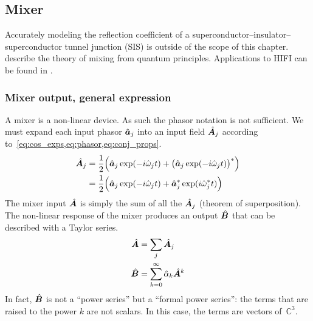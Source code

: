 \clearpage
\subsection{Mixer}
Accurately modeling the reflection coefficient of a superconductor--insulator--superconductor tunnel junction (SIS) is outside of the scope of this chapter.
\Textcite{tucker1985quantum} describe the theory of mixing from quantum principles.
Applications to HIFI can be found in \textcite{kooi2008}.

\subsubsection{Mixer output, general expression}

A mixer is a non-linear device.
As such the phasor notation is not sufficient.
We must expand
each    input phasor $\hat{\bm{a}}_j$
into an input field  $\hat{\bm{A}}_j$
according to~\cref{eq:cos_exps,eq:phasor,eq:conj_props}.
\begin{align}
    \hat{\bm{A}}_j
    &=
    \frac{1}{2}
    \Big(
              \hat{\bm{a}}_j \exp(-i \hat{\omega}_j t)
        +
        \big( \hat{\bm{a}}_j \exp(-i \hat{\omega}_j t) \big)^*
    \Big) \notag
    \\
    &=
    \frac{1}{2}
    \Big(
              \hat{\bm{a}}_j \exp(-i \hat{\omega}_j t)
        +
              \hat{\bm{a}}_j^* \exp(i \hat{\omega}_j^* t)
    \Big)
\end{align}
The mixer input $\hat{\bm{A}}$ is simply the sum of all the $\hat{\bm{A}}_j$ (theorem of superposition).
The non-linear response of the mixer produces an output $\hat{\bm{B}}$ that can be described with a Taylor series.
\begin{align}
    \hat{\bm{A}} &= \sum_{j  }          \hat{\bm{A}}_j
    \\
    \hat{\bm{B}} &= \sum_{k=0}^{\infty} \hat{\alpha}_k \hat{\bm{A}}^k
\end{align}
In fact, $\hat{\bm{B}}$ is not a ``power series'' but a ``formal power series'': the terms that are raised to the power $k$ are not scalars.
In this case, the terms are vectors of~$\mathbb{C}^3$.

